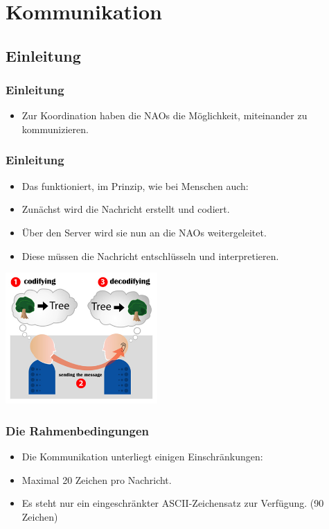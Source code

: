 
\section{Kommunikation}

\subsection{Einleitung}
\frame
{
  \frametitle{Einleitung}
  \begin{itemize}
    \item Zur Koordination haben die NAOs die M\"oglichkeit, miteinander zu kommunizieren.
  \end{itemize}
}
  
\frame
{
  \frametitle{Einleitung}
  \begin{itemize}
    \item<1-> Das funktioniert, im Prinzip, wie bei Menschen auch:
    \item<2-> Zun\"achst wird die Nachricht erstellt und codiert.
    \item<3-> \"Uber den Server wird sie nun an die NAOs weitergeleitet.
    \item<4-> Diese m\"ussen die Nachricht entschl\"usseln und interpretieren.
  \end{itemize}
  
  \begin{center}\includegraphics[height=5cm, center]{Encoding_communication.jpg}\end{center}
}

\frame
{
  \frametitle{Die Rahmenbedingungen}
  \begin{itemize}
    \item<1-> Die Kommunikation unterliegt einigen Einschr\"ankungen: \vskip0.5cm
    \item<2-> Maximal 20 Zeichen pro Nachricht.
    \item<3-> Es steht nur ein eingeschr\"ankter ASCII-Zeichensatz zur Verf\"ugung. (90 Zeichen)
  \end{itemize}
}

